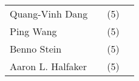 \begin{table}[htbp]
\begin{tabular}{l c l c}
        Quang-Vinh Dang & \cite{Dang2016_lr16, Dang2017_lr23, Dang2016_lr24, Dang2016_lr89, Dang2021_lr136} & (5) \\
        Ping Wang & \cite{Wang2020_lr26, Wang2021_lr48, Wang2019_lr74, Hou2021_lr122, Li2022_lr2019} & (5) \\
        Benno Stein & \cite{Anderka2012_lr17, Anderka2011_lr35, Lipka2010_lr1019, Lex2012_lr1026, Anderka2011_lr1027} & (5) \\
        Aaron L. Halfaker & \cite{Halfaker2009_lr19, Halfaker2017_lr22, Asthana2021_lr76, Halfaker2020_lr1055, Yang2016_lr2001} & (5) \\
        \bottomrule
    \end{tabular}
\end{table}